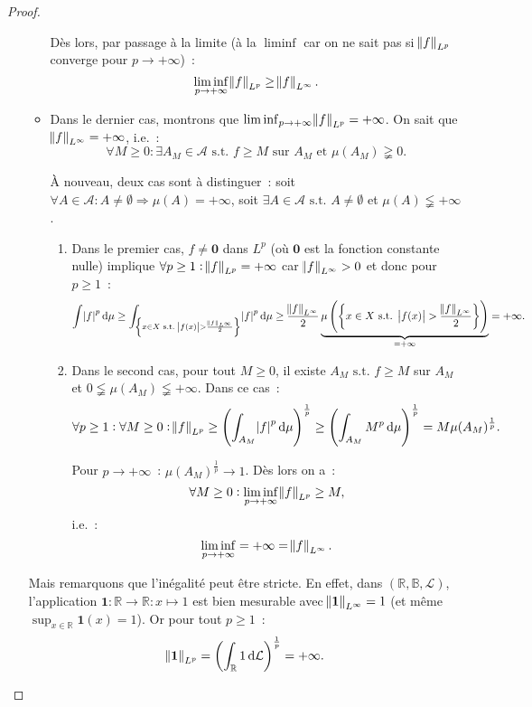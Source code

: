\documentclass{article}
\theoremstyle{definition}
\newcommand{\pinfty}{{+\infty}}
\newcommand{\st}{\text{ s.t. }}
\newcommand{\R}{{\mathbb R}}
\newcommand{\B}{{\mathbb B}}
\begin{document}
\begin{proof}
\begin{enumerate}
\begin{itemize}
		Dès lors, par passage à la limite (à la $\liminf$ car on ne sait pas si $\norm f_{L^p}$ converge pour $p \to \pinfty$)~:
		\[\liminf_{p \to \pinfty} \norm f_{L^p} \geq \norm f_{L^\infty}.\]

		\item Dans le dernier cas, montrons que $\liminf_{p \to \pinfty}\norm f_{L^p} = \pinfty$. On sait que $\norm f_{L^\infty} = \pinfty$, i.e.~:
		\[\forall M \geq 0 : \exists A_M \in \mathcal A \st f \geq M \text{ sur } A_M \text{ et } \mu(A_M) \gneqq 0.\]

		À nouveau, deux cas sont à distinguer~: soit $\forall A \in \mathcal A : A \neq \emptyset \Rightarrow \mu(A) = \pinfty$, soit $\exists A \in \mathcal A \st A \neq \emptyset$
		et $\mu(A) \lneqq \pinfty$.
		\begin{enumerate}
			\item Dans le premier cas, $f \neq \mathbf 0$ dans $L^p$ (où $\mathbf 0$ est la fonction constante nulle) implique $\forall p \geq 1 : \norm f_{L^p} = \pinfty$ car
			$\norm f_{L^\infty} > 0$ et donc pour $p \geq 1$~:
			\[\int \abs f^p\dif\mu \geq \int_{\left\{x \in X \st \abs {f(x)} > \frac {\norm f_{L^\infty}}2\right\}}\abs f^p\dif\mu
			\geq \frac {\norm f_{L^\infty}}2\underbrace {\mu\left(\left\{x \in X \st \abs {f(x)} > \frac {\norm f_{L^\infty}}2\right\}\right)}_{= \pinfty} = \pinfty.\]

			\item Dans le second cas, pour tout $M \geq 0$, il existe $A_M \st f \geq M$ sur $A_M$ et $0 \lneqq \mu(A_M) \lneqq \pinfty$. Dans ce cas~:
			\[\forall p \geq 1 : \forall M \geq 0 : \norm f_{L^p} \geq \left(\int_{A_M}\abs f^p\dif\mu\right)^{\frac 1p} \geq \left(\int_{A_M}M^p\dif\mu\right)^{\frac 1p}
			= M\mu(A_M)^{\frac 1p}.\]

			Pour $p \to \pinfty$~: $\mu(A_M)^{\frac 1p} \to 1$. Dès lors on a~:
			\[\forall M \geq 0 : \liminf_{p \to \pinfty} \norm f_{L^p} \geq M,\]
			i.e.~:
			\[\liminf_{p \to \pinfty} = \pinfty = \norm f_{L^\infty}.\]
		\end{enumerate}
	\end{itemize}

	Mais remarquons que l'inégalité peut être stricte. En effet, dans $(\R, \B, \mathcal L)$, l'application $\mathbf 1 : \R \to \R : x \mapsto 1$ est bien mesurable
	avec $\norm {\mathbf 1}_{L^\infty} = 1$ (et même $\sup_{x \in \R}\mathbf 1(x) = 1$). Or pour tout $p \geq 1$~:
	\[\norm {\mathbf 1}_{L^p} = \left(\int_\R 1\dif\mathcal L\right)^{\frac 1p} = \pinfty.\]


\end{enumerate}
\end{proof}
\end{document}
